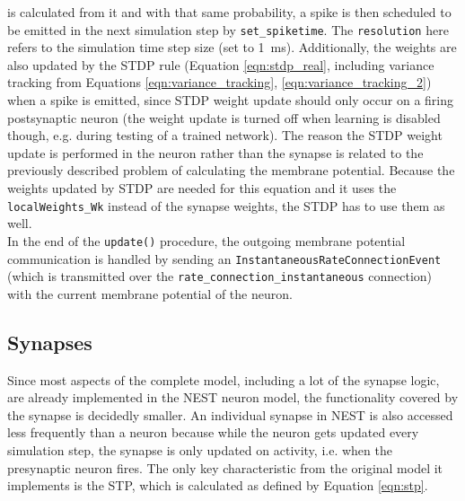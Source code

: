 is calculated from it and with that same probability, a spike is then scheduled to be emitted in the next simulation step by \texttt{set\_spiketime}. The \texttt{resolution} here refers to the simulation time step size (set to \SI{1}{\milli\second}). Additionally, the weights are also updated by the STDP rule (Equation \ref{eqn:stdp_real}, including variance tracking from Equations \ref{eqn:variance_tracking}, \ref{eqn:variance_tracking_2}) when a spike is emitted, since STDP weight update should only occur on a firing postsynaptic neuron (the weight update is turned off when learning is disabled though, e.g. during testing of a trained network). The reason the STDP weight update is performed in the neuron rather than the synapse is related to the previously described problem of calculating the membrane potential. Because the weights updated by STDP are needed for this equation and it uses the \texttt{localWeights\_Wk} instead of the synapse weights, the STDP has to use them as well.\\
In the end of the \texttt{update()} procedure, the outgoing membrane potential communication is handled by sending an \texttt{InstantaneousRateConnectionEvent} (which is transmitted over the \texttt{rate\_connection\_instantaneous} connection) with the current membrane potential of the neuron.

\subsection{Synapses} \label{ssec:synapses}
Since most aspects of the complete model, including a lot of the synapse logic, are already implemented in the NEST neuron model, the functionality covered by the synapse is decidedly smaller. An individual synapse in NEST is also accessed less frequently than a neuron because while the neuron gets updated every simulation step, the synapse is only updated on activity, i.e. when the presynaptic neuron fires. The only key characteristic from the original model it implements is the STP, which is calculated as defined by Equation \ref{eqn:stp}. 


